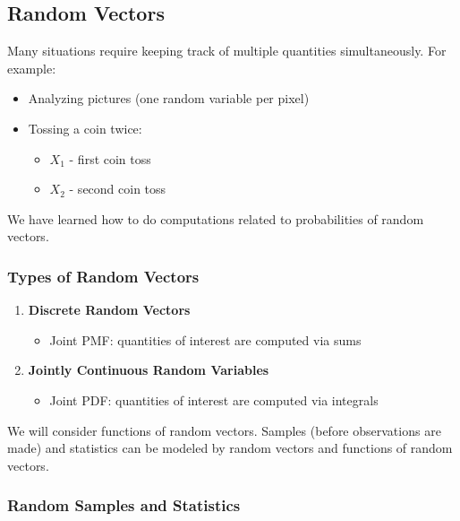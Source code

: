 \documentclass{article}
\begin{document}
    \subsection*{Random Vectors}

    Many situations require keeping track of multiple quantities simultaneously. For example:

    \begin{itemize}
        \item Analyzing pictures (one random variable per pixel)
        \item Tossing a coin twice:
        \begin{itemize}
            \item $X_1$ - first coin toss
            \item $X_2$ - second coin toss 
        \end{itemize}
    \end{itemize}

    We have learned how to do computations related to probabilities of random vectors.

    \subsubsection*{Types of Random Vectors}

    \begin{enumerate}
        \item \textbf{Discrete Random Vectors}
        \begin{itemize}
            \item Joint PMF: quantities of interest are computed via sums
        \end{itemize}

        \item \textbf{Jointly Continuous Random Variables}
        \begin{itemize}
            \item Joint PDF: quantities of interest are computed via integrals
        \end{itemize}
    \end{enumerate}

    We will consider functions of random vectors. Samples (before observations are made) and statistics can be modeled by random vectors and functions of random vectors.

    \subsubsection*{Random Samples and Statistics}
\end{document}
